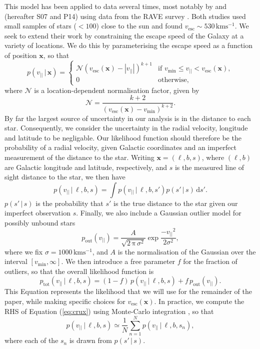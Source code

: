 \documentclass[useAMS,twocolumn,usenatbib]{mn2e}
\def\kms{{\,\mathrm{kms^{-1}}}}
\def\vlos{{v_{||}}}
\def\vesc{{v_\mathrm{esc}}}
\def\vmin{{v_\mathrm{min}}}
\def\pos{{\boldsymbol{x}}}
\def\intd{{\mathrm{d}}}
\begin{document}
This model has been applied to data several times, most 
notably by \cite{Sm07} and \cite{Pi14} (hereafter S07 and P14) using data from 
the {\sc RAVE} survey \citep{Ko13}. Both studies used 
small samples of stars ($<100$) close to the sun and 
found $\vesc \sim 530\kms$. We seek to extend their work 
by constraining the escape speed of the Galaxy at a variety 
of locations. We do this by parameterising the escape speed 
as a function of position $\pos$, so that 
%
\begin{equation}
  p(\vlos \,|\, \pos) = \begin{cases}
    \mathcal{N}(\vesc(\pos) - |\vlos|)^{k+1} & \text{if $\vmin \leq \vlos <\vesc(\pos)$},\\
    0 & \text{otherwise},
  \end{cases}
  \label{eq:model}
\end{equation}
%
where $\mathcal{N}$ is a location-dependent normalisation factor, given by
%
\begin{equation}
\mathcal{N} = \dfrac{k+2}{(\vesc(\pos) - \vmin)^{k+2}}.
\label{eq:norm}
\end{equation}
%
By far the largest source of uncertainty in our analysis is in the distance
to each star. Consequently, we consider the uncertainty in the radial 
velocity, longitude and latitude to be negligable. Our likelihood function 
should therefore be the probability of a radial velocity, given Galactic coordinates 
and an imperfect measurement of the distance to the star. Writing $\pos = (\ell, b, s)$, 
where $(\ell, b)$ are Galactic longitude and latitude, respectively, and $s$ is the 
measured line of sight distance to the star, we then have
%
\begin{equation}
p(\vlos \,|\, \ell, b, s) = \int p(\vlos \,| \,\ell, b, s' )p(s'\,|\,s)\, \intd s'.
\label{eq:crux}
\end{equation}
%
$p(s'\,|\,s)$ is the probability that $s'$ is the true distance to the star given our 
imperfect observation $s$. Finally, we also include a Gaussian outlier model for possibly 
unbound stars
%
\begin{equation}
p_\mathrm{out}(\vlos) = \dfrac{A}{\sqrt{2\,\mathrm{\pi}\,\sigma^2}}\exp \dfrac{-\vlos^2}{2\sigma^2},
\end{equation}
%
where we fix $\sigma = 1000\kms$, and $A$ is the normalisation of the Gaussian over the 
interval $\left[v_\mathrm{min},\infty\right]$. We then introduce a free parameter $f$ for the fraction 
of outliers, so that the overall likelihood function is
%
\begin{equation}
p_\mathrm{tot}(\vlos \,|\, \ell, b, s) = (1-f)\,p(\vlos \,|\, \ell, b, s) + f\,p_\mathrm{out}(\vlos).
\end{equation}
%
This Equation represents the likelihood that we will use for the remainder of the paper, while making 
specific choices for $\vesc(\pos)$. In practice, we compute the RHS of Equation (\ref{eq:crux}) using 
Monte-Carlo integration \citep[e.g.][]{Ev16,Bo16}, so that 
%
\begin{equation}
p(\vlos \,|\, \ell, b, s) \simeq \dfrac{1}{N}\sum\limits_{n=1}^{N} p(\vlos \,| \,\ell, b, s_n ),
\end{equation}
%
where each of the $s_n$ is drawn from $p(s'\,|\,s)$.
\end{document}
